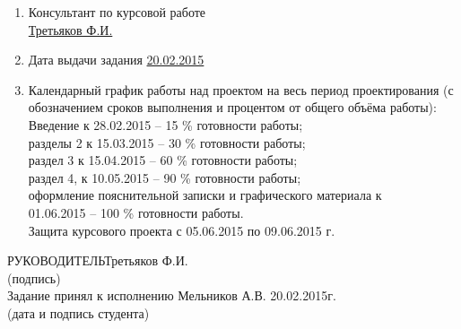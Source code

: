 \documentclass[14pt,a4paper]{extreport}
\begin{document}
\begin{enumerate}
	\item Консультант по курсовой работе\\
	\underline{Третьяков Ф.И.}  
	\item Дата выдачи задания \underline{20.02.2015}
	\item Календарный график работы над проектом на весь период проектирования (с обозначением сроков выполнения и процентом от общего объёма работы):\\
	\underline{\hspace*{16cm}}\hspace*{-16cm}Введение к 28.02.2015 – 15 \% готовности работы;\\  
	\underline{\hspace*{16cm}}\hspace*{-16cm}разделы 2  к 15.03.2015 – 30 \% готовности работы;\\ 
	\underline{\hspace*{16cm}}\hspace*{-16cm}раздел 3 к 15.04.2015 – 60 \% готовности работы;\\
	\underline{\hspace*{16cm}}\hspace*{-16cm}раздел 4,  к 10.05.2015  –  90 \% готовности работы;\\
	\underline{\hspace*{16cm}}\hspace*{-16cm}оформление пояснительной записки и графического материала к\\
	\underline{\hspace*{16cm}}\hspace*{-16cm}01.06.2015 – 100 \% готовности работы.\\
	\underline{\hspace*{16cm}}\hspace*{-16cm}Защита курсового проекта с 05.06.2015 по 09.06.2015 г.\\
	\end{enumerate}
	\hspace*{7cm}РУКОВОДИТЕЛЬ\underline{\hspace*{6cm}}\hspace*{-3.9cm}Третьяков Ф.И.\\
	\hspace*{11.5cm}\small (подпись) \normalsize\\
	\bigskip
	Задание принял к исполнению \underline{\hspace*{10.5cm}}\hspace*{-8cm}Мельников А.В. 20.02.2015г.\\
	\hspace*{7cm}\small (дата и подпись студента) \normalsize\\
	
\end{document}
